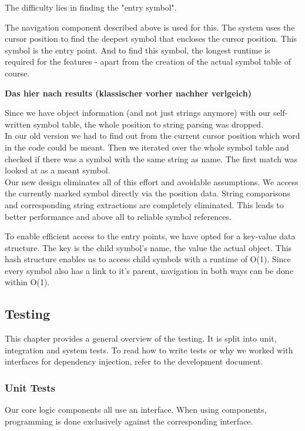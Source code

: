 The difficulty lies in finding the "entry symbol".

The navigation component described above is used for this.
The system uses the cursor position to find the deepest symbol that encloses the cursor position.
This symbol is the entry point.
And to find this symbol, the longest runtime is required for the features - apart from the creation of the actual symbol table of course.

\textbf{Das hier nach results (klassischer vorher nachher verlgeich)}

Since we have object information (and not just strings anymore) with our self-written symbol table,
the whole position to string parsing was dropped. \\

In our old version we had to find out from the current cursor position which word in the code could be meant.
Then we iterated over the whole symbol table and checked if there was a symbol with the same string as name.
The first match was looked at as a meant symbol. \\

Our new design eliminates all of this effort and avoidable assumptions.
We access the currently marked symbol directly via the position data.
String comparisons and corresponding string extractions are completely eliminated.
This leads to better performance and above all to reliable symbol references.

To enable efficient access to the entry points, we have opted for a key-value data structure.
The key is the child symbol's name, the value the actual  object.
This hash structure enables us to access child symbols with a runtime of O(1).
Since every symbol also has a link to it's parent, navigation in both ways can be done within O(1).



\subsection{Testing}

This chapter provides a general overview of the testing.
It is split into unit, integration and system tests.
To read how to write tests or why we worked with interfaces for dependency injection, refer to the development document.

\subsubsection{Unit Tests}
Our core logic components all use an interface.
When using components, programming is done exclusively against the corresponding interface. \\


